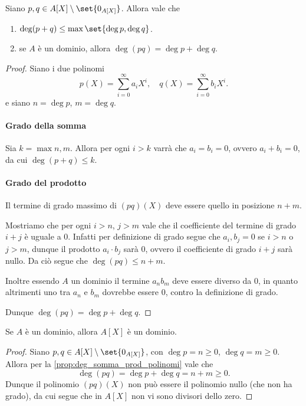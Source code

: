 \begin{proposition}
    \label{prop:deg_somma_prod_polinomi}
    Siano $p, q \in A[X] \setminus \set{0_{A[X]}}$. Allora vale che \begin{enumerate}[label={(\roman*)}]
        \item $\deg (p + q) \leq \max \set{\deg p, \deg q}$.
        \item se $A$ è un dominio, allora $\deg (pq) = \deg p + \deg q$.
    \end{enumerate}
\end{proposition}
\begin{proof}
    Siano i due polinomi \[
        p(X) = \sum_{i = 0}^\infty a_iX^i, \quad q(X) = \sum_{i = 0}^\infty b_iX^i.   
    \] e siano $n = \deg p$, $m = \deg q$.

    \paragraph{Grado della somma} Sia $k = \max {n, m}$. Allora per ogni $i > k$ varrà che $a_i = b_i = 0$, ovvero $a_i + b_i = 0$, da cui $\deg (p + q) \leq k$.

    \paragraph{Grado del prodotto} Il termine di grado massimo di $(pq)(X)$ deve essere quello in posizione $n + m$. 
    
    Mostriamo che per ogni $i > n$, $j > m$ vale che il coefficiente del termine di grado $i + j$ è uguale a $0$.
    Infatti per definizione di grado segue che $a_i, b_j = 0$ se $i > n$ o $j > m$, dunque il prodotto $a_i \cdot b_j$ sarà $0$, ovvero il coefficiente di grado $i + j$ sarà nullo. Da ciò segue che $\deg (pq) \leq n + m$.

    Inoltre essendo $A$ un dominio il termine $a_nb_m$ deve essere diverso da $0$, in quanto altrimenti uno tra $a_n$ e $b_m$ dovrebbe essere $0$, contro la definizione di grado.

    Dunque $\deg (pq) = \deg p + \deg q$.
\end{proof}

\begin{corollary}
    Se $A$ è un dominio, allora $A[X]$ è un dominio.
\end{corollary}
\begin{proof}
    Siano $p, q \in A[X] \setminus \set{0_{A[X]}}$, con $\deg p = n \geq 0$, $\deg q = m \geq 0$. Allora per la \autoref{prop:deg_somma_prod_polinomi} vale che \[
        \deg (pq) = \deg p + \deg q = n + m \geq 0.    
    \] Dunque il polinomio $(pq)(X)$ non può essere il polinomio nullo (che non ha grado), da cui segue che in $A[X]$ non vi sono divisori dello zero.
\end{proof}

